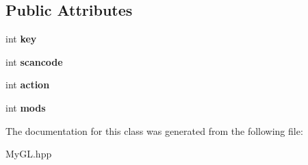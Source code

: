 \subsection*{Public Attributes}
\begin{DoxyCompactItemize}
\item 
int {\bfseries key}\hypertarget{classKey_a49ddb6c986197664f6939db5dfd9c244}{}\label{classKey_a49ddb6c986197664f6939db5dfd9c244}

\item 
int {\bfseries scancode}\hypertarget{classKey_a13cb660e3e0d92129eeeaa56c5cc8296}{}\label{classKey_a13cb660e3e0d92129eeeaa56c5cc8296}

\item 
int {\bfseries action}\hypertarget{classKey_add8acc14210865bd9959bf38ee4e82f8}{}\label{classKey_add8acc14210865bd9959bf38ee4e82f8}

\item 
int {\bfseries mods}\hypertarget{classKey_a0e3f757c5b28ee99c9bf6f07811e6637}{}\label{classKey_a0e3f757c5b28ee99c9bf6f07811e6637}

\end{DoxyCompactItemize}


The documentation for this class was generated from the following file\+:\begin{DoxyCompactItemize}
\item 
My\+G\+L.\+hpp\end{DoxyCompactItemize}
